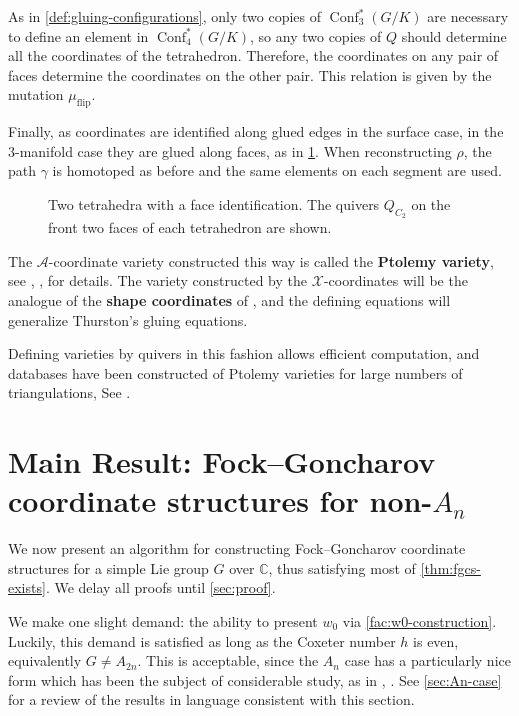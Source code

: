 \documentclass{amsart}
\theoremstyle{plain}
\theoremstyle{definition}
\theoremstyle{remark}
\newcommand{\defined}[1]{\textbf{#1}}
\newcommand{\muflip}{{\mu_{\text{flip}}}}
\DeclareMathOperator{\Conf}{Conf}
\begin{document}
  As in \cref{def:gluing-configurations}, only two copies of
  $\Conf_3^{\ast}(G/K)$ are necessary to define an element in
  $\Conf_4^{\ast}(G/K)$, so any two copies of $Q$ should determine all
  the coordinates of the tetrahedron. Therefore, the coordinates on any
  pair of faces determine the coordinates on the other pair. This
  relation is given by the mutation $\muflip$.

  Finally, as coordinates are identified along glued edges in the
  surface case, in the $3$-manifold case they are glued along faces, as
  in \cref{fig:tetrahedra-with-quivers}. When reconstructing $\rho$, the
  path $\gamma$ is homotoped as before and the same elements on each
  segment are used.

  \begin{figure}[h]
    \centering
    

    \caption{Two tetrahedra with a face identification. The quivers
      $Q_{C_2}$ on the front two faces of each tetrahedron are shown.
      \label{fig:tetrahedra-with-quivers}
    }
  \end{figure}

  The $\mathcal{A}$-coordinate variety constructed this way is called
  the \defined{Ptolemy variety}, see \cite{ggz2015}, \cite{gtz2015},
  \cite{zickert2016} for details. The variety constructed by the
  $\mathcal{X}$-coordinates will be the analogue of the \defined{shape
    coordinates} of \cite{ggz2015}, and the defining equations will
  generalize Thurston's gluing equations.

  Defining varieties by quivers in this fashion allows efficient
  computation, and databases have been constructed of Ptolemy varieties
  for large numbers of triangulations, See \cite{unhyperbolic}.

  \section{Main Result: Fock--Goncharov coordinate structures for
    non-\texorpdfstring{$A_n$}{A\_n}}

  \label{sec:main-result}

  We now present an algorithm for constructing Fock--Goncharov
  coordinate structures for a simple Lie group $G$ over $\mathbb{C}$,
  thus satisfying most of \cref{thm:fgcs-exists}. We delay all proofs
  until \cref{sec:proof}.

  We make one slight demand: the ability to present $w_0$ via
  \cref{fac:w0-construction}. Luckily, this demand is satisfied as long
  as the Coxeter number $h$ is even, equivalently $G \ne A_{2n}$. This
  is acceptable, since the $A_n$ case has a particularly nice form which
  has been the subject of considerable study, as in
  \cite{fockgoncharov2006}, \cite{gtz2015}. See \cref{sec:An-case} for a
  review of the results in language consistent with this section.
\end{document}
